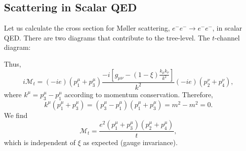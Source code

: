 \documentclass[11pt]{article}
\theoremstyle{definition}
\begin{document}
\subsection{Scattering in Scalar QED}
Let us calculate the cross section for Møller scattering, $e^-e^-\rightarrow e^-e^-$, in scalar QED. There are two diagrams that contribute to the tree-level. The $t$-channel diagram:
\begin{center}
\end{center}
Thus,
\begin{equation}
    i\mathcal{M}_t = (-ie)(p_1^\mu + p_3^\mu)\frac{-i\left[ g_{\mu\nu} - (1-\xi)\frac{k_\mu k_\nu}{k^2}\right]}{k^2}(-ie)(p_2^\nu + p_4^\nu),
\end{equation}
where $k^\mu = p_3^\mu - p_1^\mu$ according to momentum conservation. Therefore,
\begin{equation}
    k^\mu(p_1^\mu + p_3^\mu) = (p_3^\mu - p_1^\mu)(p_1^\mu + p_3^\mu) = m^2 - m^2 = 0.
\end{equation}
We find
\begin{equation}
    \mathcal{M}_t =\frac{e^2(p_1^\mu + p_3^\mu)(p_2^\mu + p_4^\mu)}{t},
\end{equation}
which is independent of $\xi$ as expected (gauge invariance). 
\end{document}
